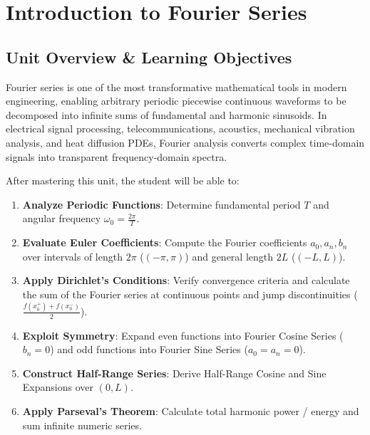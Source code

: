 \chapter{Introduction to Fourier Series}
\label{chap:fourier-series}

\section{Unit Overview \& Learning Objectives}

Fourier series is one of the most transformative mathematical tools in modern engineering, enabling arbitrary periodic piecewise continuous waveforms to be decomposed into infinite sums of fundamental and harmonic sinusoids. In electrical signal processing, telecommunications, acoustics, mechanical vibration analysis, and heat diffusion PDEs, Fourier analysis converts complex time-domain signals into transparent frequency-domain spectra.

\begin{important}
After mastering this unit, the student will be able to:
\begin{enumerate}[leftmargin=1.5em]
    \item \textbf{Analyze Periodic Functions}: Determine fundamental period $T$ and angular frequency $\omega_0 = \frac{2\pi}{T}$.
    \item \textbf{Evaluate Euler Coefficients}: Compute the Fourier coefficients $a_0, a_n, b_n$ over intervals of length $2\pi$ ($(-\pi, \pi)$) and general length $2L$ ($(-L, L)$).
    \item \textbf{Apply Dirichlet's Conditions}: Verify convergence criteria and calculate the sum of the Fourier series at continuous points and jump discontinuities ($\frac{f(x_0^+) + f(x_0^-)}{2}$).
    \item \textbf{Exploit Symmetry}: Expand even functions into Fourier Cosine Series ($b_n = 0$) and odd functions into Fourier Sine Series ($a_0 = a_n = 0$).
    \item \textbf{Construct Half-Range Series}: Derive Half-Range Cosine and Sine Expansions over $(0, L)$.
    \item \textbf{Apply Parseval's Theorem}: Calculate total harmonic power / energy and sum infinite numeric series.
\end{enumerate}
\end{important}

